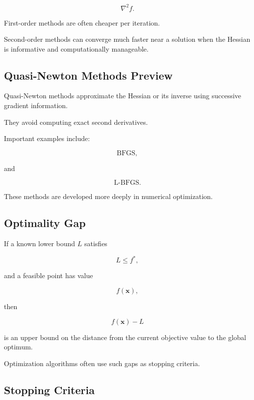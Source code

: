 \[
\boxed{
\nabla^2f.
}
\]

First-order methods are often cheaper per iteration.

Second-order methods can converge much faster near a solution when the
Hessian is informative and computationally manageable.

\subsection{Quasi-Newton Methods Preview}
\label{subsec:quasi-newton-preview}

Quasi-Newton methods approximate the Hessian or its inverse using
successive gradient information.

They avoid computing exact second derivatives.

Important examples include:

\[
\boxed{
\text{BFGS},
}
\]

and

\[
\boxed{
\text{L-BFGS}.
}
\]

These methods are developed more deeply in numerical optimization.

\subsection{Optimality Gap}
\label{subsec:optimality-gap}

If a known lower bound \(L\) satisfies

\[
L\leq f^*,
\]

and a feasible point has value

\[
f(\mathbf{x}),
\]

then

\[
\boxed{
f(\mathbf{x})-L
}
\]

is an upper bound on the distance from the current objective value to the
global optimum.

Optimization algorithms often use such gaps as stopping criteria.

\subsection{Stopping Criteria}
\label{subsec:optimization-stopping-criteria}

